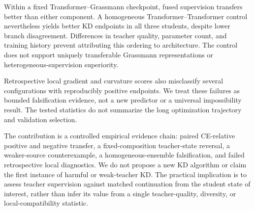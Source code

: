Within a fixed Transformer--Grassmann checkpoint, fused supervision transfers better than either component. A homogeneous Transformer--Transformer control nevertheless yields better KD endpoints in all three students, despite lower branch disagreement. Differences in teacher quality, parameter count, and training history prevent attributing this ordering to architecture. The control does not support uniquely transferable Grassmann representations or heterogeneous-supervision superiority.

Retrospective local gradient and curvature scores also misclassify several configurations with reproducibly positive endpoints. We treat these failures as bounded falsification evidence, not a new predictor or a universal impossibility result. The tested statistics do not summarize the long optimization trajectory and validation selection.

The contribution is a controlled empirical evidence chain: paired CE-relative positive and negative transfer, a fixed-composition teacher-state reversal, a weaker-source counterexample, a homogeneous-ensemble falsification, and failed retrospective local diagnostics. We do not propose a new KD algorithm or claim the first instance of harmful or weak-teacher KD. The practical implication is to assess teacher supervision against matched continuation from the student state of interest, rather than infer its value from a single teacher-quality, diversity, or local-compatibility statistic.
